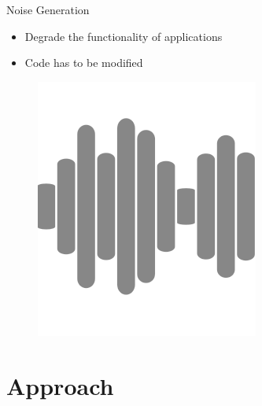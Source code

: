 \documentclass[aspectratio=169]{beamer}
[aspectratio=169] %
\begin{document}
\begin{frame}{Noise Generation}
  \begin{minipage}{0.49\textwidth} 
    \begin{itemize}
      \item Degrade the functionality of applications
      \item Code has to be modified
    \end{itemize}
  \end{minipage}
  \hfill
  \begin{minipage}{0.49\textwidth} 
    \begin{figure}
      \centering
      \includegraphics[height=0.5\textheight]{figures/noise.png}
    \end{figure}
  \end{minipage}
\end{frame}

\section{Approach}
\end{document}
